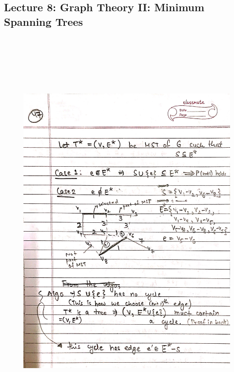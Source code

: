 \newpage
{\color{black} \subsection*{Lecture 8: Graph Theory II: Minimum Spanning Trees}}
\begin{figure}[H]
    \centering
    \includegraphics[width=16cm, height=21cm]{"./MIT-6.042J/MIT-6042J-047"}
\end{figure}

